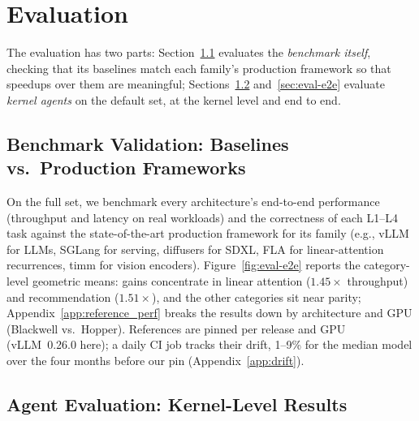 \section{Evaluation}
\label{sec:evaluation}

The evaluation has two parts: Section~\ref{sec:eval-results} evaluates the \emph{benchmark itself}, checking that its baselines match each family's production framework so that speedups over them are meaningful; Sections~\ref{sec:eval-agents} and~\ref{sec:eval-e2e} evaluate \emph{kernel agents} on the default set, at the kernel level and end to end.

\subsection{Benchmark Validation: Baselines vs.\ Production Frameworks}
\label{sec:eval-results}

On the full set, we benchmark every architecture's end-to-end performance (throughput and latency on real workloads) and the correctness of each L1--L4 task against the state-of-the-art production framework for its family (e.g., vLLM for LLMs, SGLang for serving, diffusers for SDXL, FLA for linear-attention recurrences, timm for vision encoders).
Figure~\ref{fig:eval-e2e} reports the category-level geometric means: gains concentrate in linear attention ($1.45\times$ throughput) and recommendation ($1.51\times$), and the other categories sit near parity; Appendix~\ref{app:reference_perf} breaks the results down by architecture and GPU (Blackwell vs.\ Hopper).
References are pinned per release and GPU (vLLM~0.26.0 here); a daily CI job tracks their drift, 1--9\% for the median model over the four months before our pin (Appendix~\ref{app:drift}).


\subsection{Agent Evaluation: Kernel-Level Results}
\label{sec:eval-agents}

